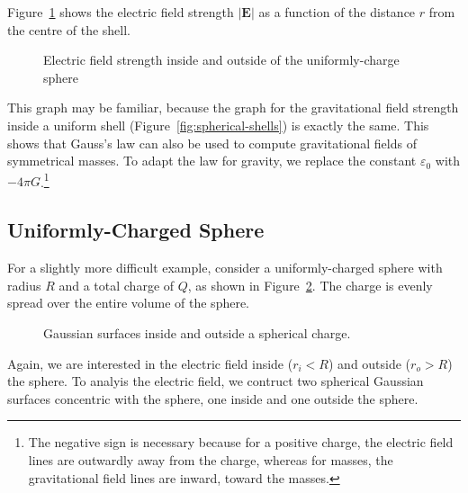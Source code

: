 Figure~\ref{fig:E-spherical-shell} shows the electric field strength $|\bm E|$
as a function of the distance $r$ from the centre of the shell.
\begin{figure}[ht]
  \centering
  \caption{Electric field strength inside and outside of the uniformly-charge
    sphere}
  \label{fig:E-spherical-shell}
\end{figure}
This graph may be familiar, because the graph for the gravitational field
strength inside a uniform shell (Figure~\ref{fig:spherical-shells}) is exactly
the same. This shows that Gauss's law can also be used to compute gravitational
fields of symmetrical masses. To adapt the law for gravity, we replace the
constant $\varepsilon_0$ with $-4\pi G$.\footnote{The negative sign is necessary
because for a positive charge, the electric field lines are outwardly away
from the charge, whereas for masses, the gravitational field lines are inward,
toward the masses.}



\subsection{Uniformly-Charged Sphere}
For a slightly more difficult example, consider a uniformly-charged sphere
with radius $R$ and a total charge of $Q$, as shown in
Figure~\ref{fig:uniform-spherical-charge}. The charge is evenly spread over the
entire volume of the sphere.
\begin{figure}[ht]
  \centering
  \caption{Gaussian surfaces inside and outside a spherical charge.}
  \label{fig:uniform-spherical-charge}
\end{figure}
Again, we are interested in the electric field inside ($r_i<R$) and outside
($r_o>R$) the sphere. To analyis the electric field, we contruct two spherical
Gaussian surfaces concentric with the sphere, one inside and one outside the
sphere.

